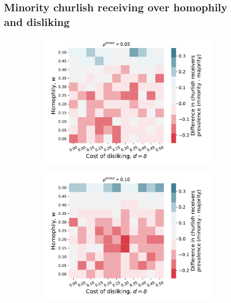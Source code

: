 \documentclass[11pt,letterpaper]{article}
\begin{document}
\subsection{Minority churlish receiving over homophily and disliking}

\begin{figure}[H]
  \centering
  \begin{subfigure}{0.48\textwidth}
    \centering
    \includegraphics[width=\textwidth]{Figures/churlish_receivers_diff_0p05.pdf}
  \end{subfigure}
  \hfill
  \begin{subfigure}{0.48\textwidth}
    \centering
    \includegraphics[width=\textwidth]{Figures/churlish_receivers_diff_0p10.pdf}

\end{subfigure}
\end{figure}
\end{document}
